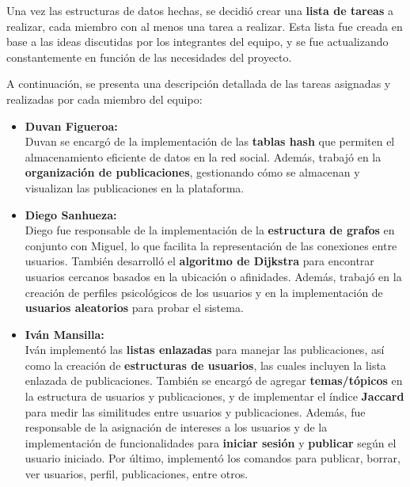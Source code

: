 \documentclass[9pt,letterpaper,onecolumn]{rho-class/rho}
\begin{document}
    \vspace{0.5cm}

    Una vez las estructuras de datos hechas, se decidió crear una \textbf{lista de tareas} a realizar, cada miembro con al menos una tarea a realizar. Esta lista fue creada en base a las ideas discutidas por los integrantes del equipo, y se fue actualizando constantemente en función de las necesidades del proyecto.

    A continuación, se presenta una descripción detallada de las tareas asignadas y realizadas por cada miembro del equipo:
    
    \begin{itemize}
        \item \textbf{Duvan Figueroa:} \\
        Duvan se encargó de la implementación de las \textbf{tablas hash} que permiten el almacenamiento eficiente de datos en la red social. Además, trabajó en la \textbf{organización de publicaciones}, gestionando cómo se almacenan y visualizan las publicaciones en la plataforma.
    
        \item \textbf{Diego Sanhueza:} \\
        Diego fue responsable de la implementación de la \textbf{estructura de grafos} en conjunto con Miguel, lo que facilita la representación de las conexiones entre usuarios. También desarrolló el \textbf{algoritmo de Dijkstra} para encontrar usuarios cercanos basados en la ubicación o afinidades. Además, trabajó en la creación de perfiles psicológicos de los usuarios y en la implementación de \textbf{usuarios aleatorios} para probar el sistema.
    
        \item \textbf{Iván Mansilla:} \\
        Iván implementó las \textbf{listas enlazadas} para manejar las publicaciones, así como la creación de \textbf{estructuras de usuarios}, las cuales incluyen la lista enlazada de publicaciones. También se encargó de agregar \textbf{temas/tópicos} en la estructura de usuarios y publicaciones, y de implementar el índice \textbf{Jaccard} para medir las similitudes entre usuarios y publicaciones. Además, fue responsable de la asignación de intereses a los usuarios y de la implementación de funcionalidades para \textbf{iniciar sesión} y \textbf{publicar} según el usuario iniciado. Por último, implementó los comandos para publicar, borrar, ver usuarios, perfil, publicaciones, entre otros.
    

\end{itemize}
\end{document}
